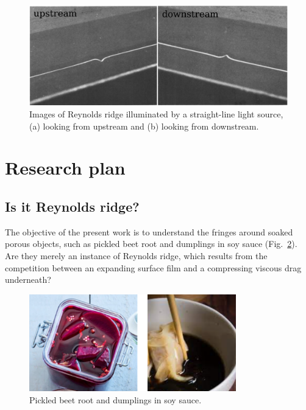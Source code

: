\documentclass[12pt]{article}
\begin{document}
\begin{figure}
    \centering
    \includegraphics[width=\textwidth]{Figures/straightline-light-source-images.pdf}
    \caption{Images of Reynolds ridge illuminated by a straight-line light source, (a) looking from upstream and (b) looking from downstream.}
    \label{fig:straightline-light-source-images}
\end{figure}

\section{Research plan}

\subsection{Is it Reynolds ridge?}

The objective of the present work is to understand the fringes around soaked porous objects, such as pickled beet root and dumplings in soy sauce (Fig.~\ref{fig:beet-and-dumplings}). Are they merely an instance of Reynolds ridge, which results from the competition between an expanding surface film and a compressing viscous drag underneath?

\begin{figure}
    \centering
    \includegraphics[width=0.8\textwidth]{Figures/beet-and-dumplings.pdf}
    \caption{Pickled beet root and dumplings in soy sauce.}
    \label{fig:beet-and-dumplings}
\end{figure}
\end{document}
